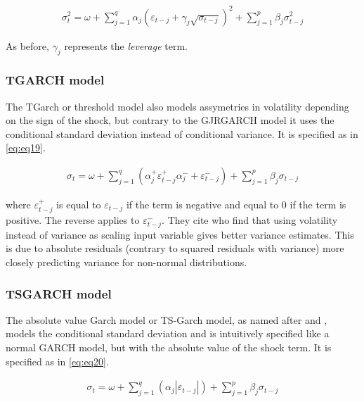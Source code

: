 \documentclass[a4paper, twoside]{templates/ociamthesis}
\begin{document}
\begin{align}
\sigma_t^2 = \omega + \sum\limits_{j=1}^q \alpha_j (\varepsilon_{t-j}+ \gamma_j \sqrt{\sigma_{t-j}})^2 + \sum\limits_{j = 1}^p \beta_j \sigma_{t-j}^2
 \label{eq:eq18}
\end{align}

As before, \(\gamma_j\) represents the \emph{leverage} term.

\hypertarget{tgarch-model}{%
\subsubsection{TGARCH model}\label{tgarch-model}}

The TGarch or threshold model \autocite{zakoian1994} also models assymetries in volatility depending on the sign of the shock, but contrary to the GJRGARCH model it uses the conditional standard deviation instead of conditional variance. It is specified as in \eqref{eq:eq19}.

\begin{align}
\sigma_t = \omega + \sum\limits_{j=1}^q (\alpha_j^+ \varepsilon_{t-j}^+ \alpha_j^{-} + \varepsilon_{t-j}^{-}) + \sum\limits_{j = 1}^p \beta_j \sigma_{t-j}
 \label{eq:eq19}
\end{align}

where \(\varepsilon_{t-j}^+\) is equal to \(\varepsilon_{t-j}\) if the term is negative and equal to 0 if the term is positive. The reverse applies to \(\varepsilon_{t-j}^-\). They cite \textcite{davidian1987} who find that using volatility instead of variance as scaling input variable gives better variance estimates. This is due to absolute residuals (contrary to squared residuals with variance) more closely predicting variance for non-normal distributions.

\hypertarget{tsgarch-model}{%
\subsubsection{TSGARCH model}\label{tsgarch-model}}

The absolute value Garch model or TS-Garch model, as named after \textcite{taylor1986} and \textcite{schwert1989}, models the conditional standard deviation and is intuitively specified like a normal GARCH model, but with the absolute value of the shock term. It is specified as in \eqref{eq:eq20}.

\begin{align}
\sigma_t = \omega + \sum\limits_{j=1}^q (\alpha_j \left|\varepsilon_{t-j}\right|) +
\sum\limits_{j = 1}^p \beta_j \sigma_{t-j}
 \label{eq:eq20}
\end{align}
\end{document}
